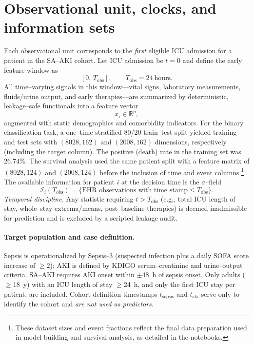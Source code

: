 \section{Observational unit, clocks, and information sets}
Each observational unit corresponds to the \emph{first} eligible ICU admission for a patient in the SA--AKI cohort. Let ICU admission be $t{=}0$ and define the early feature window as
\[
[0,\,T_{\mathrm{obs}}], \qquad T_{\mathrm{obs}}=24~\text{hours}.
\]
All time–varying signals in this window—vital signs, laboratory measurements, fluids/urine output, and early therapies—are summarized by deterministic, leakage–safe functionals into a feature vector
\[
x_i \in \mathbb{R}^p,
\]
augmented with static demographics and comorbidity indicators. For the binary classification task, a one–time stratified 80/20 train–test split yielded training and test sets with $(8028, 162)$ and $(2008, 162)$ dimensions, respectively (including the target column). The positive (death) rate in the training set was $26.74\%$. The survival analysis used the same patient split with a feature matrix of $(8028, 124)$ and $(2008, 124)$ before the inclusion of time and event columns.\footnote{These dataset sizes and event fractions reflect the final data preparation used in model building and survival analysis, as detailed in the notebooks.}
The available information for patient $i$ at the decision time is the $\sigma$–field
\[
\mathcal{I}_i(T_{\mathrm{obs}})=\{\text{EHR observations with time stamp}\le T_{\mathrm{obs}}\}.
\]
\emph{Temporal discipline.} Any statistic requiring $t>T_{\mathrm{obs}}$ (e.g., total ICU length of stay, whole–stay extrema/means, post–baseline therapies) is deemed inadmissible for prediction and is excluded by a scripted leakage audit.

\paragraph{Target population and case definition.}
Sepsis is operationalized by Sepsis--3 (suspected infection plus a daily SOFA score increase of $\ge 2$); AKI is defined by KDIGO serum–creatinine and urine–output criteria. SA--AKI requires AKI onset within $\pm48$~h of sepsis onset. Only adults ($\ge$18~y) with an ICU length of stay $\ge$24~h, and only the first ICU stay per patient, are included. Cohort definition timestamps $t_{\text{sepsis}}$ and $t_{\text{aki}}$ serve only to identify the cohort and \emph{are not used as predictors}.

